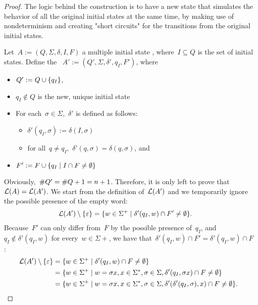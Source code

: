 \begin{proof}
	The logic behind the construction is to have a new state that simulates the behavior of all the original initial states at the same time, by making use of nondeterminism and creating "short circuits" for the transitions from the original initial states.

	Let~$A:=(Q,\Sigma,\delta,I,F)$ a multiple initial state \ONFA, where~$I\subseteq Q$ is the set of initial states.
	Define the \ONFA~$A':=(Q',\Sigma,\delta',q_I,F')$, where
	\begin{itemize}
		\item $Q':=Q\cup\{q_I\}$,
		\item $q_I\notin Q$ is the new, unique initial state
		\item For each~$\sigma\in\Sigma$,~$\delta'$ is defined as follows:
		      \begin{itemize}
			      \item $\delta'(q_I,\sigma):=\delta(I,\sigma)$
			      \item for all~$q\ne q_I$,~$\delta'(q,\sigma)=\delta(q,\sigma)$, and
		      \end{itemize}
		\item $F':=F\cup\{q_I\mid I\cap F\ne\emptyset\}$
	\end{itemize}
	Obviously,~$\# Q'=\# Q+1=n+1$. Therefore, it is only left to prove that~$\mathcal L(A)=\mathcal L(A')$.
	We start from the definition of~$\mathcal L(A')$ and we temporarily ignore the possible presence of the empty word:
	\begin{align*}
		\mathcal L(A')\setminus\{\varepsilon\} & = \{w\in\Sigma^+\mid \delta'(q_I,w)\cap F'\ne\emptyset\} \text.
	\end{align*}
	Because~$F'$ can only differ from~$F$ by the possible presence of~$q_I$, and~$q_I\notin\delta'(q_I,w)$ for every~$w\in\Sigma\plus$, we have that~$\delta'(q_I,w)\cap F'=\delta'(q_I,w)\cap F$:
	\begin{align*}
		\genlang(A')\setminus\set{\emptyword} & = \set{w\in\Sigma\plus\mid \delta'(q_I,w)\cap F\ne\emptyset}                                                                    \\
		                                      & = \set{w\in\Sigma\plus\mid w=\sigma x, x\in\Sigma\star,\sigma\in\Sigma,\delta'(q_I,\sigma x)\cap F\ne\emptyset}                 \\
		                                      & = \set{w\in\Sigma\plus\mid w=\sigma x, x\in\Sigma\star,\sigma\in\Sigma,\delta'(\delta'(q_I,\sigma),x)\cap F\ne\emptyset} \text.

\end{align*}
\end{proof}
